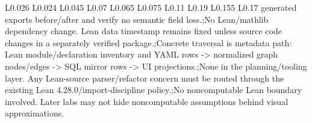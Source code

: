 \begin{longtable}{L{0.026\linewidth} L{0.024\linewidth} L{0.045\linewidth} L{0.07\linewidth} L{0.065\linewidth} L{0.075\linewidth} L{0.11\linewidth} L{0.19\linewidth} L{0.155\linewidth} L{0.17\linewidth}}
generated exports before/\allowbreak{}after and verify no semantic field loss.;\newline No Lean/\allowbreak{}mathlib dependency change. Lean data timestamp remains fixed unless source code changes in a separately verified package.;\newline Concrete traversal is metadata path: Lean module/\allowbreak{}declaration inventory and YAML rows -> normalized graph nodes/\allowbreak{}edges -> SQL mirror rows -> UI projections.;\newline None in the planning/\allowbreak{}tooling layer. Any Lean-source parser/\allowbreak{}refactor concern must be routed through the existing Lean 4.28.0/\allowbreak{}import-discipline policy.;\newline No noncomputable Lean boundary involved. Later labs may not hide noncomputable assumptions behind visual approximations.\\
\hline
\addlinespace[0.24em]

\end{longtable}
